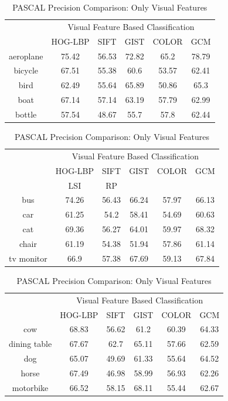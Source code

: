 \begin{table}[!ht]
\centering
\caption{ PASCAL Precision Comparison: Only Visual Features} %
\vspace*{0.2 cm}
\begin{tabular}{| c | c | c | c | c | c |}
\hline
 {\multirow{2}{*}{Labels}} & \multicolumn{5}{|c|}{Visual Feature Based Classification} \\
 \cline{2-6}
  & HOG-LBP & SIFT & GIST & COLOR & GCM \\  [1ex] \hline
aeroplane & 75.42 & 56.53 & 72.82 & 65.2 & 78.79 \\  [1ex] \hline
bicycle & 67.51 & 55.38 & 60.6 & 53.57 & 62.41 \\  [1ex] \hline
bird & 62.49 & 55.64 & 65.89 & 50.86 & 65.3 \\  [1ex] \hline
boat & 67.14 & 57.14 & 63.19 & 57.79 & 62.99 \\  [1ex] \hline
bottle & 57.54 & 48.67 & 55.7 & 57.8 & 62.44 \\  [1ex] \hline
\end{tabular}
 \hspace{1em}
\begin{tabular}{| c | c | c | c | c | c |}
\hline
 {\multirow{2}{*}{Labels}} & \multicolumn{5}{|c|}{Visual Feature Based Classification} \\
 \cline{2-6}
  & HOG-LBP & SIFT & GIST & COLOR & GCM \\  [1ex] \hline
 & LSI & RP \\ \hline
bus & 74.26 & 56.43 & 66.24 & 57.97 & 66.13 \\  [1ex] \hline
car & 61.25 & 54.2 & 58.41 & 54.69 & 60.63 \\  [1ex] \hline
cat & 69.36 & 56.27 & 64.01 & 59.97 & 68.32 \\  [1ex] \hline
chair & 61.19 & 54.38 & 51.94 & 57.86 & 61.14 \\  [1ex] \hline
tv monitor & 66.9 & 57.38 & 67.69 & 59.13 & 67.84 \\  [1ex] \hline
\end{tabular}
 \hspace{1em}
 \begin{tabular}{| c | c | c | c | c | c |}
\hline
 {\multirow{2}{*}{Labels}} & \multicolumn{5}{|c|}{Visual Feature Based Classification} \\
 \cline{2-6}
  & HOG-LBP & SIFT & GIST & COLOR & GCM \\  [1ex] \hline
cow & 68.83 & 56.62 & 61.2 & 60.39 & 64.33 \\  [1ex] \hline
dining table & 67.67 & 62.7 & 65.11 & 57.66 & 62.59 \\  [1ex] \hline
dog & 65.07 & 49.69 & 61.33 & 55.64 & 64.52 \\  [1ex] \hline
horse & 67.49 & 46.98 & 58.99 & 56.93 & 62.26 \\  [1ex] \hline
motorbike & 66.52 & 58.15 & 68.11 & 55.44 & 62.67 \\  [1ex] \hline
\end{tabular}
 \hspace{1em}


\end{table}
